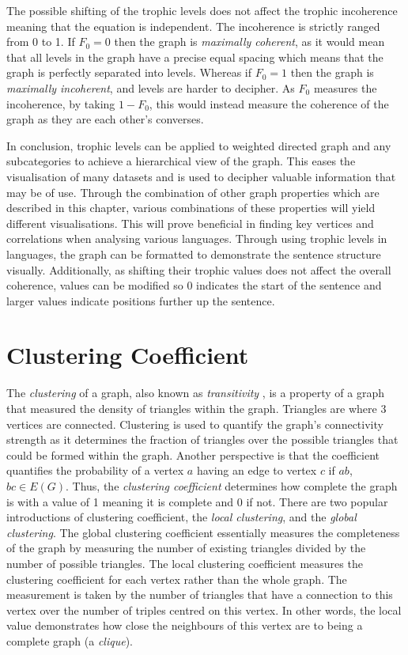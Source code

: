 The possible shifting of the trophic levels does not affect the trophic incoherence meaning that the equation is independent. The incoherence is strictly ranged from 0 to 1. If $F_0 = 0$  then the graph is \emph{maximally coherent}, as it would mean that all levels in the graph have a precise equal spacing which means that the graph is perfectly separated into levels. Whereas if $F_0 = 1$ then the graph is \emph{maximally incoherent}, and levels are harder to decipher. As $F_0$ measures the incoherence, by taking $1 - F_0$, this would instead measure the coherence of the graph as they are each other's converses. 
\newline

In conclusion, trophic levels can be applied to weighted directed graph and any subcategories to achieve a hierarchical view of the graph. This eases the visualisation of many datasets and is used to decipher valuable information that may be of use. Through the combination of other graph properties which are described in this chapter, various combinations of these properties will yield different visualisations. This will prove beneficial in finding key vertices and correlations when analysing various languages. Through using trophic levels in languages, the graph can be formatted to demonstrate the sentence structure visually. Additionally, as shifting their trophic values does not affect the overall coherence, values can be modified so 0 indicates the start of the sentence and larger values indicate positions further up the sentence.

\section{Clustering Coefficient}
The \emph{clustering} of a graph, also known as \emph{transitivity} \cite{schank2005approximating}, is a property of a graph that measured the density of triangles within the graph. Triangles are where 3 vertices are connected. Clustering is used to quantify the graph's connectivity strength as it determines the fraction of triangles over the possible triangles that could be formed within the graph. Another perspective is that the coefficient quantifies the probability of a vertex $a$ having an edge to vertex $c$ if $ab$, $bc \in E(G)$. Thus, the \emph{clustering coefficient} determines how complete the graph is with a value of 1 meaning it is complete and 0 if not. There are two popular introductions of clustering coefficient, the \emph{local clustering}, and the \emph{global clustering}. The global clustering coefficient essentially measures the completeness of the graph by measuring the number of existing triangles divided by the number of possible triangles. The local clustering coefficient measures the clustering coefficient for each vertex rather than the whole graph. The measurement is taken by the number of triangles that have a connection to this vertex over the number of triples centred on this vertex. In other words, the local value demonstrates how close the neighbours of this vertex are to being a complete graph (a \emph{clique}).

